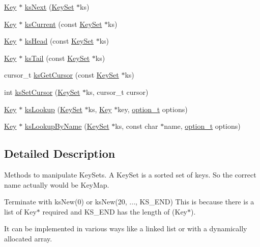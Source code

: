 \begin{DoxyCompactItemize}
\item 
\hyperlink{struct__Key}{Key} $\ast$ \hyperlink{group__keyset_ga317321c9065b5a4b3e33fe1c399bcec9}{ksNext} (\hyperlink{struct__KeySet}{KeySet} $\ast$ks)
\item 
\hyperlink{struct__Key}{Key} $\ast$ \hyperlink{group__keyset_ga4287b9416912c5f2ab9c195cb74fb094}{ksCurrent} (const \hyperlink{struct__KeySet}{KeySet} $\ast$ks)
\item 
\hyperlink{struct__Key}{Key} $\ast$ \hyperlink{group__keyset_gae7dbf3aef70e67b5328475eb3d1f92f5}{ksHead} (const \hyperlink{struct__KeySet}{KeySet} $\ast$ks)
\item 
\hyperlink{struct__Key}{Key} $\ast$ \hyperlink{group__keyset_gadca442c4ab43cf532b15091d7711559e}{ksTail} (const \hyperlink{struct__KeySet}{KeySet} $\ast$ks)
\item 
cursor\_\-t \hyperlink{group__keyset_gaffe507ab9281c322eb16c3e992075d29}{ksGetCursor} (const \hyperlink{struct__KeySet}{KeySet} $\ast$ks)
\item 
int \hyperlink{group__keyset_gad94c9ffaa3e8034564c0712fd407c345}{ksSetCursor} (\hyperlink{struct__KeySet}{KeySet} $\ast$ks, cursor\_\-t cursor)
\item 
\hyperlink{struct__Key}{Key} $\ast$ \hyperlink{group__keyset_gaa34fc43a081e6b01e4120daa6c112004}{ksLookup} (\hyperlink{struct__KeySet}{KeySet} $\ast$ks, \hyperlink{struct__Key}{Key} $\ast$key, \hyperlink{group__kdb_ga98a3d6a4016c9dad9cbd1a99a9c2a45a}{option\_\-t} options)
\item 
\hyperlink{struct__Key}{Key} $\ast$ \hyperlink{group__keyset_gad2e30fb6d4739d917c5abb2ac2f9c1a1}{ksLookupByName} (\hyperlink{struct__KeySet}{KeySet} $\ast$ks, const char $\ast$name, \hyperlink{group__kdb_ga98a3d6a4016c9dad9cbd1a99a9c2a45a}{option\_\-t} options)
\end{DoxyCompactItemize}


\subsection{Detailed Description}
Methods to manipulate KeySets. A KeySet is a sorted set of keys. So the correct name actually would be KeyMap.

Terminate with ksNew(0) or ksNew(20, ..., KS\_\-END) This is because there is a list of Key$\ast$ required and KS\_\-END has the length of (Key$\ast$).

It can be implemented in various ways like a linked list or with a dynamically allocated array.


